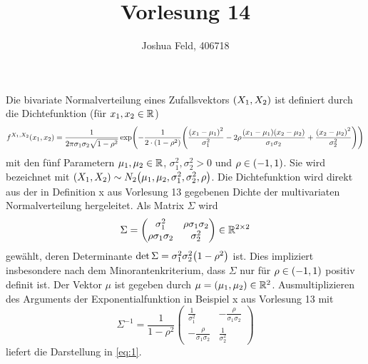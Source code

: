 \documentclass{lecture}
\institute{Institut für Statistik und Wirtschaftsmathematik}
\title{Vorlesung 14}
\author{Joshua Feld, 406718}
\begin{document}
    \maketitle


    \begin{example}
        Die bivariate Normalverteilung eines Zufallsvektors \(\parentheses*{X_1, X_2}\) ist definiert durch die Dichtefunktion (für \(x_1, x_2 \in \R\))
        \begin{equation}\label{eq:1}
            f^{X_1, X_2}\parentheses*{x_1, x_2} = \frac{1}{2\pi\sigma_1 \sigma_2 \sqrt{1 - \rho^2}}\exp\parentheses*{-\frac{1}{2 \cdot \parentheses*{1 - \rho^2}}\parentheses*{\frac{\parentheses*{x_1 - \mu_1}^2}{\sigma_1^2} - 2\rho\frac{\parentheses*{x_1 - \mu_1}\parentheses*{x_2 - \mu_2}}{\sigma_1 \sigma_2} + \frac{\parentheses*{x_2 - \mu_2}^2}{\sigma_2^2}}}
        \end{equation}
        mit den fünf Parametern \(\mu_1, \mu_2 \in \R\), \(\sigma_1^2, \sigma_2^2 > 0\) und \(\rho \in \parentheses*{-1, 1}\).
        Sie wird bezeichnet mit \(\parentheses*{X_1, X_2} \sim N_2\parentheses*{\mu_1, \mu_2, \sigma_1^2, \sigma_2^2, \rho}\).
        Die Dichtefunktion wird direkt aus der in Definition x aus Vorlesung 13 gegebenen Dichte der multivariaten Normalverteilung hergeleitet.
        Als Matrix \(\Sigma\) wird
        \[
            \Sigma = \begin{pmatrix}
                \sigma_1^2 & \rho\sigma_1 \sigma_2\\
                \rho\sigma_1 \sigma_2 & \sigma_2^2
            \end{pmatrix} \in \R^{2 \times 2}
        \]
        gewählt, deren Determinante \(\det\Sigma = \sigma_1^2 \sigma_2^2\parentheses*{1 - \rho^2}\) ist.
        Dies impliziert insbesondere nach dem Minorantenkriterium, dass \(\Sigma\) nur für \(\rho \in \parentheses*{-1, 1}\) positiv definit ist.
        Der Vektor \(\mu\) ist gegeben durch \(\mu = \parentheses*{\mu_1, \mu_2} \in \R^2\).
        Ausmultiplizieren des Arguments der Exponentialfunktion in Beispiel x aus Vorlesung 13 mit
        \[
            \Sigma^{-1} = \frac{1}{1 - \rho^2}\begin{pmatrix}
                \frac{1}{\sigma_1^2} & -\frac{\rho}{\sigma_1 \sigma_2}\\
                -\frac{\rho}{\sigma_1 \sigma_2} & \frac{1}{\sigma_2^2}
            \end{pmatrix}
        \]
        liefert die Darstellung in \eqref{eq:1}.
    \end{example}
\end{document}
